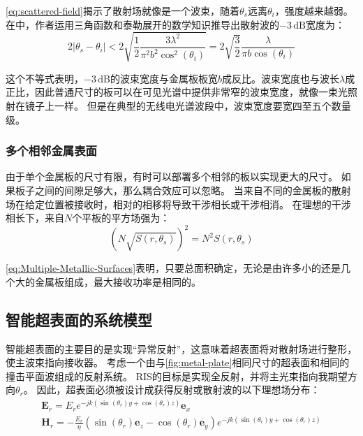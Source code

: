 \documentclass[supercite]{HustGraduPaper}
\begin{document}
\autoref{eq:scattered-field}揭示了散射场就像是一个波束，随着$\theta_{s}$远离$\theta_{i}$，强度越来越弱。在中，作者运用三角函数和泰勒展开的数学知识推导出散射波的$-3\,\mathrm{dB}$宽度为：
\begin{equation}
	2\left|\theta_{s}-\theta_{i}\right|<2\sqrt{\frac{1}{2} \frac{3 \lambda^{2}}{\pi^{2} b^{2} \cos ^{2}\left(\theta_{i}\right)}}=2\sqrt{\frac{3}{2}} \frac{\lambda}{\pi b \cos \left(\theta_{i}\right)}
\end{equation}

这个不等式表明，$-3\,\mathrm{dB}$的波束宽度与金属板板宽$b$成反比。波束宽度也与波长$\lambda$成正比，因此普通尺寸的板可以在可见光谱中提供非常窄的波束宽度，就像一束光照射在镜子上一样。
但是在典型的无线电光谱波段中，波束宽度要宽四至五个数量级。

\subsubsection{多个相邻金属表面}

由于单个金属板的尺寸有限，有时可以部署多个相邻的板以实现更大的尺寸。
如果板子之间的间隙足够大，那么耦合效应可以忽略。
当来自不同的金属板的散射场在给定位置被接收时，相对的相移将导致干涉相长或干涉相消。
在理想的干涉相长下，来自$N$个平板的平方场强为：
\begin{equation}
	\left(N \sqrt{S\left(r, \theta_{s}\right)}\right)^{2}=N^{2} S\left(r, \theta_{s}\right)
	\label{eq:Multiple-Metallic-Surfaces}
\end{equation}

\autoref{eq:Multiple-Metallic-Surfaces}表明，只要总面积确定，无论是由许多小的还是几个大的金属板组成，最大接收功率是相同的。

\subsection{智能超表面的系统模型}

智能超表面的主要目的是实现“异常反射”\cite{liang2015anomalous}，这意味着超表面将对散射场进行整形，使主波束指向接收器。
考虑一个由与\autoref{fig:metal-plate}相同尺寸的超表面和相同的撞击平面波组成的反射系统。
RIS的目标是实现全反射，并将主光束指向我期望方向$\theta_r$。
因此，超表面必须被设计成获得反射或散射波的以下理想场分布：
\begin{equation}
	\begin{array}{l}
		\mathbf{E}_{r}=E_{r} e^{-j k\left(\sin \left(\theta_{r}\right) y+\cos \left(\theta_{r}\right) z\right)} \boldsymbol{e}_{x} \\
		\mathbf{H}_{r}=-\frac{E_{r}}{\eta}\left(\sin \left(\theta_{r}\right) \boldsymbol{e}_{z}-\cos \left(\theta_{r}\right) \boldsymbol{e}_{y}\right) e^{-j k\left(\sin \left(\theta_{r}\right) y+\cos \left(\theta_{r}\right) z\right)}
	\end{array}
\end{equation}
\end{document}
